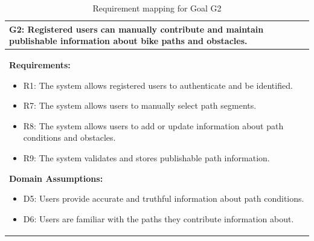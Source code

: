 \begin{table}[H]
\centering
\renewcommand{\arraystretch}{1.2}
\begin{tabular}{|p{}|}
\hline
\textbf{G2:} Registered users can manually contribute and maintain publishable
information about bike paths and obstacles. \\ \hline

\textbf{Requirements:}
\begin{itemize}
  \item R1: The system allows registered users to authenticate and be identified.
  \item R7: The system allows users to manually select path segments.
  \item R8: The system allows users to add or update information about path conditions and obstacles.
  \item R9: The system validates and stores publishable path information.
\end{itemize}

\textbf{Domain Assumptions:}
\begin{itemize}
  \item D5: Users provide accurate and truthful information about path conditions.
  \item D6: Users are familiar with the paths they contribute information about.
\end{itemize}
\\ \hline
\end{tabular}
\caption{Requirement mapping for Goal G2}
\end{table}

